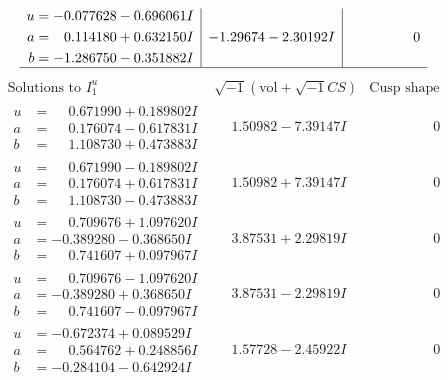 \documentclass[1p]{elsarticle_modified}
\theoremstyle{definition}
\newcommand{\I}{\sqrt{-1}}
\begin{document}
$$\begin{array}{c|c|c}
\begin{aligned}
u &= -0.077628 - 0.696061 I \\
a &= \phantom{-}0.114180 + 0.632150 I \\
b &= -1.286750 - 0.351882 I\end{aligned}
 & -1.29674 - 2.30192 I & \phantom{-0.000000 } 0\\
 \hline 
 \end{array}$$\newpage$$\begin{array}{c|c|c}  
\text{Solutions to }I^u_{1}& \I (\text{vol} + \sqrt{-1}CS) & \text{Cusp shape}\\
 \hline 
\begin{aligned}
u &= \phantom{-}0.671990 + 0.189802 I \\
a &= \phantom{-}0.176074 - 0.617831 I \\
b &= \phantom{-}1.108730 + 0.473883 I\end{aligned}
 & \phantom{-}1.50982 - 7.39147 I & \phantom{-0.000000 } 0 \\ \hline\begin{aligned}
u &= \phantom{-}0.671990 - 0.189802 I \\
a &= \phantom{-}0.176074 + 0.617831 I \\
b &= \phantom{-}1.108730 - 0.473883 I\end{aligned}
 & \phantom{-}1.50982 + 7.39147 I & \phantom{-0.000000 } 0 \\ \hline\begin{aligned}
u &= \phantom{-}0.709676 + 1.097620 I \\
a &= -0.389280 - 0.368650 I \\
b &= \phantom{-}0.741607 + 0.097967 I\end{aligned}
 & \phantom{-}3.87531 + 2.29819 I & \phantom{-0.000000 } 0 \\ \hline\begin{aligned}
u &= \phantom{-}0.709676 - 1.097620 I \\
a &= -0.389280 + 0.368650 I \\
b &= \phantom{-}0.741607 - 0.097967 I\end{aligned}
 & \phantom{-}3.87531 - 2.29819 I & \phantom{-0.000000 } 0 \\ \hline\begin{aligned}
u &= -0.672374 + 0.089529 I \\
a &= \phantom{-}0.564762 + 0.248856 I \\
b &= -0.284104 - 0.642924 I\end{aligned}
 & \phantom{-}1.57728 - 2.45922 I & \phantom{-0.000000 } 0 \\ \hline\begin{aligned}

\end{aligned}
\end{array}$$
\end{document}
